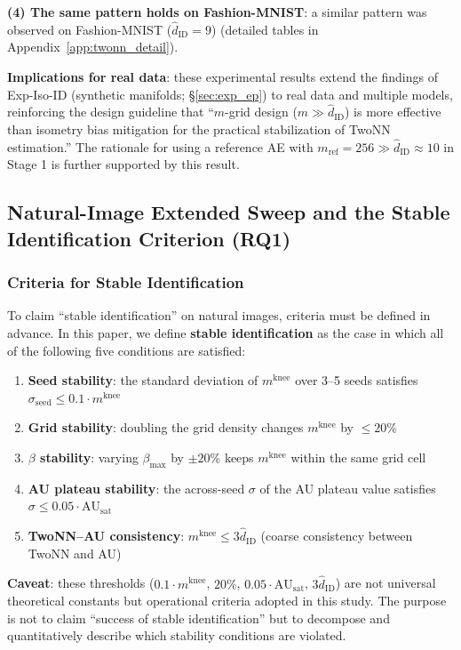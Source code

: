 \documentclass[make,article,submit,pdftex,moreauthors]{Definitions/mdpi}
\newcommand{\AUsat}{\mathrm{AU}_{\mathrm{sat}}}
\newcommand{\mknee}{m^{\mathrm{knee}}}
\begin{document}
\textbf{(4) The same pattern holds on Fashion-MNIST}:
a similar pattern was observed on Fashion-MNIST ($\hat{d}_\mathrm{ID}=9$)
(detailed tables in Appendix~\ref{app:twonn_detail}).

\textbf{Implications for real data}:
these experimental results extend the findings of Exp-Iso-ID (synthetic
manifolds; \S\ref{sec:exp_ep}) to real data and multiple models, reinforcing
the design guideline that ``$m$-grid design ($m \gg \hat{d}_\mathrm{ID}$) is
more effective than isometry bias mitigation for the practical stabilization
of TwoNN estimation.''
The rationale for using a reference AE with
$m_\mathrm{ref}=256 \gg \hat{d}_\mathrm{ID} \approx 10$ in Stage 1 is further
supported by this result.

\subsection{Natural-Image Extended Sweep and the Stable Identification Criterion (RQ1)}\label{sec:exp_natimg_sweep}

\subsubsection*{Criteria for Stable Identification}\label{sec:natimg_stable_id}

To claim ``stable identification'' on natural images, criteria must be defined
in advance.
In this paper, we define \textbf{stable identification} as the case in which
all of the following five conditions are satisfied:

\begin{enumerate}
  \item \textbf{Seed stability}: the standard deviation of $\mknee$ over 3--5 seeds satisfies $\sigma_\mathrm{seed} \leq 0.1 \cdot \mknee$
  \item \textbf{Grid stability}: doubling the grid density changes $\mknee$ by $\leq 20\%$
  \item \textbf{$\beta$ stability}: varying $\beta_{\max}$ by $\pm 20\%$ keeps $\mknee$ within the same grid cell
  \item \textbf{AU plateau stability}: the across-seed $\sigma$ of the AU plateau value satisfies $\sigma \leq 0.05 \cdot \AUsat$
  \item \textbf{TwoNN--AU consistency}: $\mknee \leq 3 \hat{d}_\mathrm{ID}$ (coarse consistency between TwoNN and AU)
\end{enumerate}

\textbf{Caveat}: these thresholds ($0.1\cdot\mknee$, $20\%$,
$0.05\cdot\AUsat$, $3\hat{d}_\mathrm{ID}$) are not universal theoretical
constants but operational criteria adopted in this study.
The purpose is not to claim ``success of stable identification'' but to
decompose and quantitatively describe which stability conditions are violated.
\end{document}

